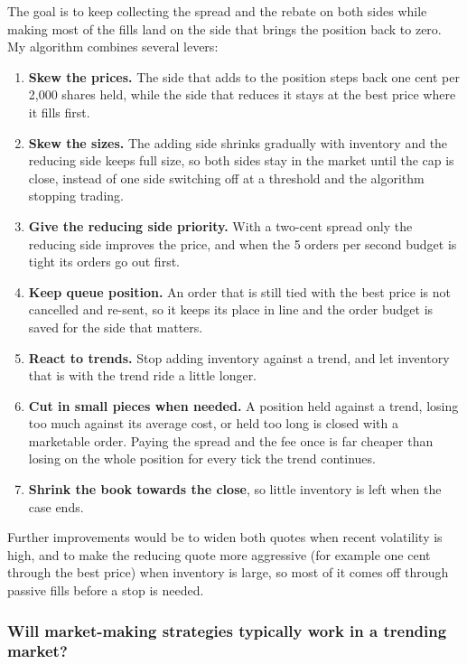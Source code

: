 \documentclass{article}
\begin{document}
The goal is to keep collecting the spread and the rebate on both sides while making most of the fills
land on the side that brings the position back to zero. My algorithm combines several levers:
\begin{enumerate}
  \item \textbf{Skew the prices.} The side that adds to the position steps back one cent per 2,000 shares
        held, while the side that reduces it stays at the best price where it fills first.
  \item \textbf{Skew the sizes.} The adding side shrinks gradually with inventory and the reducing side
        keeps full size, so both sides stay in the market until the cap is close, instead of one side
        switching off at a threshold and the algorithm stopping trading.
  \item \textbf{Give the reducing side priority.} With a two-cent spread only the reducing side improves
        the price, and when the 5 orders per second budget is tight its orders go out first.
  \item \textbf{Keep queue position.} An order that is still tied with the best price is not cancelled
        and re-sent, so it keeps its place in line and the order budget is saved for the side that
        matters.
  \item \textbf{React to trends.} Stop adding inventory against a trend, and let inventory that is with the
        trend ride a little longer.
  \item \textbf{Cut in small pieces when needed.} A position held against a trend, losing too much against
        its average cost, or held too long is closed with a marketable order. Paying the spread and the
        fee once is far cheaper than losing on the whole position for every tick the trend continues.
  \item \textbf{Shrink the book towards the close}, so little inventory is left when the case ends.
\end{enumerate}
Further improvements would be to widen both quotes when recent volatility is high, and to make the
reducing quote more aggressive (for example one cent through the best price) when inventory is large,
so most of it comes off through passive fills before a stop is needed.

\subsubsection{Will market-making strategies typically work in a trending market?}
\end{document}
